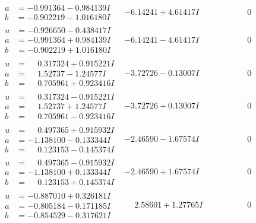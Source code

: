 \documentclass[1p]{elsarticle_modified}
\theoremstyle{definition}
\begin{document}
$$\begin{array}{c|c|c}
\begin{aligned}
a &= -0.991364 - 0.984139 I \\
b &= -0.902219 - 1.016180 I\end{aligned}
 & -6.14241 + 4.61417 I & \phantom{-0.000000 } 0 \\ \hline\begin{aligned}
u &= -0.926650 - 0.438417 I \\
a &= -0.991364 + 0.984139 I \\
b &= -0.902219 + 1.016180 I\end{aligned}
 & -6.14241 - 4.61417 I & \phantom{-0.000000 } 0 \\ \hline\begin{aligned}
u &= \phantom{-}0.317324 + 0.915221 I \\
a &= \phantom{-}1.52737 - 1.24577 I \\
b &= \phantom{-}0.705961 + 0.923416 I\end{aligned}
 & -3.72726 - 0.13007 I & \phantom{-0.000000 } 0 \\ \hline\begin{aligned}
u &= \phantom{-}0.317324 - 0.915221 I \\
a &= \phantom{-}1.52737 + 1.24577 I \\
b &= \phantom{-}0.705961 - 0.923416 I\end{aligned}
 & -3.72726 + 0.13007 I & \phantom{-0.000000 } 0 \\ \hline\begin{aligned}
u &= \phantom{-}0.497365 + 0.915932 I \\
a &= -1.138100 - 0.133344 I \\
b &= \phantom{-}0.123153 - 0.145374 I\end{aligned}
 & -2.46590 - 1.67574 I & \phantom{-0.000000 } 0 \\ \hline\begin{aligned}
u &= \phantom{-}0.497365 - 0.915932 I \\
a &= -1.138100 + 0.133344 I \\
b &= \phantom{-}0.123153 + 0.145374 I\end{aligned}
 & -2.46590 + 1.67574 I & \phantom{-0.000000 } 0 \\ \hline\begin{aligned}
u &= -0.887010 + 0.326181 I \\
a &= -0.805184 - 0.171185 I \\
b &= -0.854529 - 0.317621 I\end{aligned}
 & \phantom{-}2.58601 + 1.27765 I & \phantom{-0.000000 } 0 \\ \hline\begin{aligned}

\end{aligned}
\end{array}$$
\end{document}
